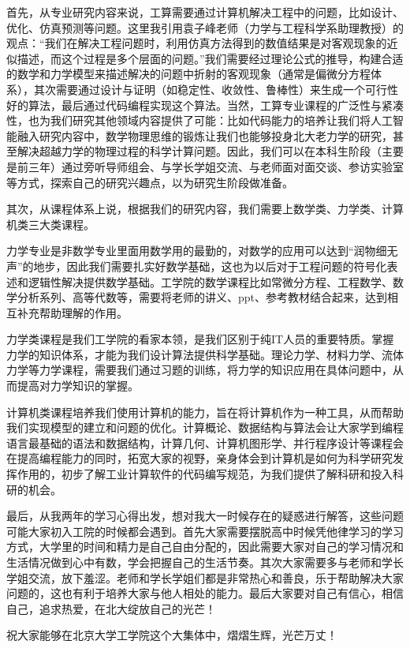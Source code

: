 \documentclass[11pt,oneside]{book}
\begin{document}
首先，从专业研究内容来说，工算需要通过计算机解决工程中的问题，比如设计、优化、仿真预测等问题。这里我引用袁子峰老师（力学与工程科学系助理教授）的观点：“我们在解决工程问题时，利用仿真方法得到的数值结果是对客观现象的近似描述，而这个过程是多个层面的问题。”我们需要经过理论公式的推导，构建合适的数学和力学模型来描述解决的问题中折射的客观现象（通常是偏微分方程体系），其次需要通过设计与证明（如稳定性、收敛性、鲁棒性）来生成一个可行性好的算法，最后通过代码编程实现这个算法。当然，工算专业课程的广泛性与紧凑性，也为我们研究其他领域内容提供了可能：比如代码能力的培养让我们将人工智能融入研究内容中，数学物理思维的锻炼让我们也能够投身北大老力学的研究，甚至解决超越力学的物理过程的科学计算问题。因此，我们可以在本科生阶段（主要是前三年）通过旁听导师组会、与学长学姐交流、与老师面对面交谈、参访实验室等方式，探索自己的研究兴趣点，以为研究生阶段做准备。

其次，从课程体系上说，根据我们的研究内容，我们需要上数学类、力学类、计算机类三大类课程。

力学专业是非数学专业里面用数学用的最勤的，对数学的应用可以达到“润物细无声”的地步，因此我们需要扎实好数学基础，这也为以后对于工程问题的符号化表述和逻辑性解决提供数学基础。工学院的数学课程比如常微分方程、工程数学、数学分析系列、高等代数等，需要将老师的讲义、ppt、参考教材结合起来，达到相互补充帮助理解的作用。

力学类课程是我们工学院的看家本领，是我们区别于纯IT人员的重要特质。掌握力学的知识体系，才能为我们设计算法提供科学基础。理论力学、材料力学、流体力学等力学课程，需要我们通过习题的训练，将力学的知识应用在具体问题中，从而提高对力学知识的掌握。

计算机类课程培养我们使用计算机的能力，旨在将计算机作为一种工具，从而帮助我们实现模型的建立和问题的优化。计算概论、数据结构与算法会让大家学到编程语言最基础的语法和数据结构，计算几何、计算机图形学、并行程序设计等课程会在提高编程能力的同时，拓宽大家的视野，亲身体会到计算机是如何为科学研究发挥作用的，初步了解工业计算软件的代码编写规范，为我们提供了解科研和投入科研的机会。

最后，从我两年的学习心得出发，想对我大一时候存在的疑惑进行解答，这些问题可能大家初入工院的时候都会遇到。首先大家需要摆脱高中时候凭他律学习的学习方式，大学里的时间和精力是自己自由分配的，因此需要大家对自己的学习情况和生活情况做到心中有数，学会把握自己的生活节奏。其次大家需要多与老师和学长学姐交流，放下羞涩。老师和学长学姐们都是非常热心和善良，乐于帮助解决大家问题的，这也有利于培养大家与他人相处的能力。最后大家要对自己有信心，相信自己，追求热爱，在北大绽放自己的光芒！

祝大家能够在北京大学工学院这个大集体中，熠熠生辉，光芒万丈！
\end{document}
